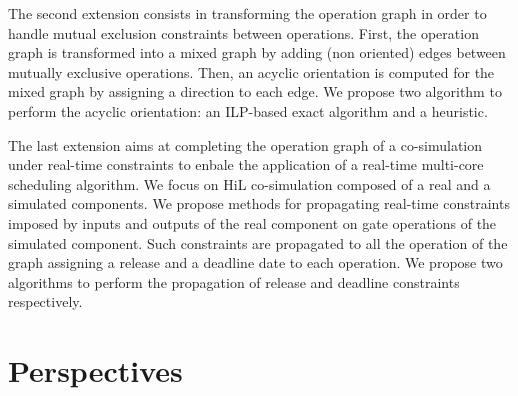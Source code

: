 The second extension consists in transforming the operation graph in order to handle mutual exclusion constraints between operations. First, the operation graph is transformed into a mixed graph by adding (non oriented) edges between mutually exclusive operations. Then, an acyclic orientation is computed for the mixed graph by assigning a direction to each edge. We propose two algorithm to perform the acyclic orientation: an ILP-based exact algorithm and a heuristic.

The last extension aims at completing the operation graph of a co-simulation under real-time constraints to enbale the application of a real-time multi-core scheduling algorithm. We focus on HiL co-simulation composed of a real and a simulated components. We propose methods for propagating real-time constraints imposed by inputs and outputs of the real component on gate operations of the simulated component. Such constraints are propagated to all the operation of the graph assigning a release and a deadline date to each operation. We propose two algorithms to perform the propagation of release and deadline constraints respectively.     

\section{Perspectives}